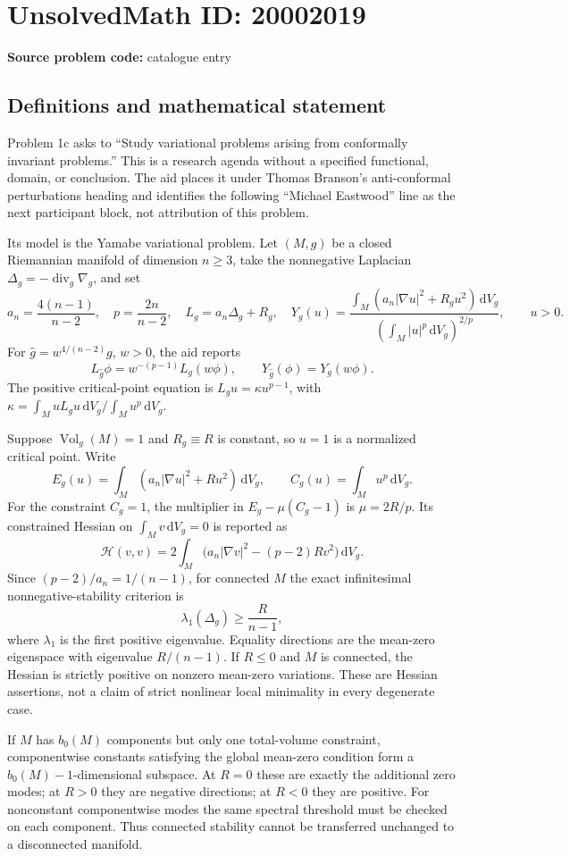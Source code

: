 \documentclass[11pt]{article}
\newcommand{\dd}{\,\mathrm{d}}
\begin{document}
\section*{UnsolvedMath ID: 20002019}
\textbf{Source problem code:} catalogue entry
\subsection{Definitions and mathematical statement}
Problem 1c asks to ``Study variational problems arising from conformally invariant problems.'' This is a research agenda without a specified functional, domain, or conclusion. The aid places it under Thomas Branson's anti-conformal perturbations heading and identifies the following ``Michael Eastwood'' line as the next participant block, not attribution of this problem.

Its model is the Yamabe variational problem. Let \((M,g)\) be a closed Riemannian manifold of dimension \(n\ge3\), take the nonnegative Laplacian \(\Delta_g=-\operatorname{div}_g\nabla_g\), and set
\[
 a_n=\frac{4(n-1)}{n-2},\quad p=\frac{2n}{n-2},\quad
 L_g=a_n\Delta_g+R_g,
 \quad
 Y_g(u)=\frac{\int_M(a_n|\nabla u|^2+R_gu^2)\dd V_g}
 {(\int_M|u|^p\dd V_g)^{2/p}},\qquad u>0.
\]
For \(\widehat g=w^{4/(n-2)}g\), \(w>0\), the aid reports
\[
 L_{\widehat g}\phi=w^{-(p-1)}L_g(w\phi),\qquad
 Y_{\widehat g}(\phi)=Y_g(w\phi).
\]
The positive critical-point equation is \(L_gu=\kappa u^{p-1}\), with
\(\kappa=\int_MuL_gu\dd V_g/\int_Mu^p\dd V_g\).

Suppose \(\operatorname{Vol}_g(M)=1\) and \(R_g\equiv R\) is constant, so \(u=1\) is a normalized critical point. Write
\[
 E_g(u)=\int_M(a_n|\nabla u|^2+Ru^2)\dd V_g,
 \qquad C_g(u)=\int_Mu^p\dd V_g.
\]
For the constraint \(C_g=1\), the multiplier in \(E_g-\mu(C_g-1)\) is \(\mu=2R/p\). Its constrained Hessian on \(\int_Mv\dd V_g=0\) is reported as
\[
 \mathcal H(v,v)=2\int_M\bigl(a_n|\nabla v|^2-(p-2)Rv^2\bigr)\dd V_g.
\]
Since \((p-2)/a_n=1/(n-1)\), for connected \(M\) the exact infinitesimal nonnegative-stability criterion is
\[
 \lambda_1(\Delta_g)\ge\frac{R}{n-1},
\]
where \(\lambda_1\) is the first positive eigenvalue. Equality directions are the mean-zero eigenspace with eigenvalue \(R/(n-1)\). If \(R\le0\) and \(M\) is connected, the Hessian is strictly positive on nonzero mean-zero variations. These are Hessian assertions, not a claim of strict nonlinear local minimality in every degenerate case.

If \(M\) has \(b_0(M)\) components but only one total-volume constraint, componentwise constants satisfying the global mean-zero condition form a \(b_0(M)-1\)-dimensional subspace. At \(R=0\) these are exactly the additional zero modes; at \(R>0\) they are negative directions; at \(R<0\) they are positive. For nonconstant componentwise modes the same spectral threshold must be checked on each component. Thus connected stability cannot be transferred unchanged to a disconnected manifold.
\end{document}
